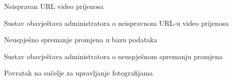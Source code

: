 \begin{packed_item}
\begin{packed_item}
							\item[3.a] Neispravan URL video prijenosa
							\item[] \begin{packed_enum}
								Sustav obavještava administratora o neispravnom URL-u video prijenosa
							\end{packed_enum}
							
							\item[5.a] Neuspješno spremanje promjena u bazu podataka
							\item[] \begin{packed_enum}
								
								\item Sustav obavještava administratora o neuspješnom spremanju promjena
								\item Povratak na sučelje za upravljanje fotografijama
								
							\end{packed_enum}
						\end{packed_item}
					\end{packed_item}
					
